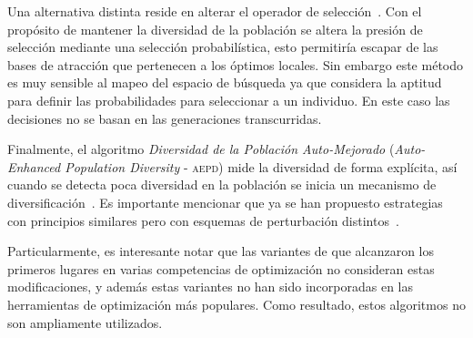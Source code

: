 Una alternativa distinta reside en alterar el operador de selección~\cite{sa2008exploration}.
%
Con el propósito de mantener la diversidad de la población se altera la presión de selección mediante una selección probabilística, esto permitiría escapar de las bases de atracción que pertenecen a los óptimos locales.
%
Sin embargo este método es muy sensible al mapeo del espacio de búsqueda ya que considera la aptitud para definir las probabilidades para seleccionar a un individuo.
%
En este caso las decisiones no se basan en las generaciones transcurridas.

Finalmente, el algoritmo \textit{Diversidad de la Población Auto-Mejorado} (\textit{Auto-Enhanced Population Diversity} - \textsc{aepd}) mide la diversidad de forma explícita, así cuando se detecta poca diversidad en la población se inicia un mecanismo de diversificación~\cite{yang2015differential}.
%
Es importante mencionar que ya se han propuesto estrategias con principios similares pero con esquemas de perturbación distintos~\cite{zhao2016differential}.


Particularmente, es interesante notar que las variantes de \DE{} que alcanzaron los primeros lugares en varias competencias de optimización no consideran estas modificaciones, y además estas variantes no han sido incorporadas en las herramientas de optimización más populares.
%
Como resultado, estos algoritmos no son ampliamente utilizados.


